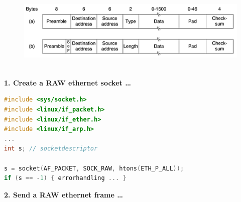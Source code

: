    \begin{figure}[h]
    \centering
    \includegraphics[width=15cm, height=4cm]{Images/image57.png}
    \label{fig:Fig }
    \end{figure}
\newpage

\textbf{ 1. Create a RAW ethernet socket {\dots}}

\begin{lstlisting}[style=mystyle, language=c]
#include <sys/socket.h>
#include <linux/if_packet.h>
#include <linux/if_ether.h>
#include <linux/if_arp.h>
...
int s; // socketdescriptor

s = socket(AF_PACKET, SOCK_RAW, htons(ETH_P_ALL));
if (s == -1) { errorhandling ... }
\end{lstlisting}


\textbf{2. Send a RAW ethernet frame {\dots}}

